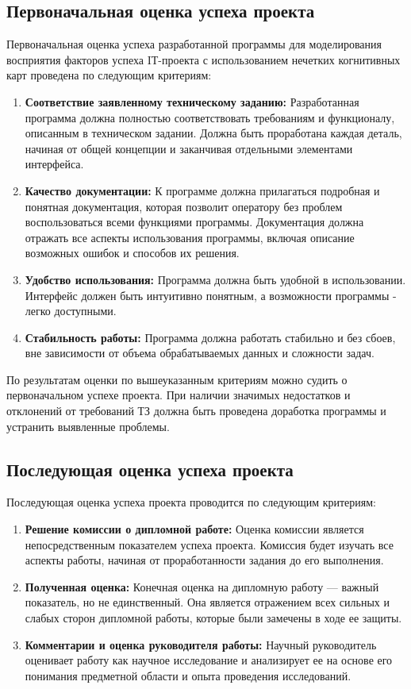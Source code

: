 \documentclass{article}
\begin{document}
    \subsection {Первоначальная оценка успеха проекта}
    Первоначальная оценка успеха разработанной программы для моделирования восприятия факторов успеха IТ-проекта с использованием нечетких когнитивных карт проведена по следующим критериям:
    \begin{enumerate}
        \item \textbf{Соответствие заявленному техническому заданию:} Разработанная программа должна полностью соответствовать требованиям и функционалу, описанным в техническом задании. Должна быть проработана каждая деталь, начиная от общей концепции и заканчивая отдельными элементами интерфейса.
        \item \textbf{Качество документации:} К программе должна прилагаться подробная и понятная документация, которая позволит оператору без проблем воспользоваться всеми функциями программы. Документация должна отражать все аспекты использования программы, включая описание возможных ошибок и способов их решения.
        \item \textbf{Удобство использования:} Программа должна быть удобной в использовании. Интерфейс должен быть интуитивно понятным, а возможности программы - легко доступными.
        \item \textbf{Стабильность работы:} Программа должна работать стабильно и без сбоев, вне зависимости от объема обрабатываемых данных и сложности задач.
    \end{enumerate}
    По результатам оценки по вышеуказанным критериям можно судить о первоначальном успехе проекта. При наличии значимых недостатков и отклонений от требований ТЗ должна быть проведена доработка программы и устранить выявленные проблемы.
    \subsection {Последующая оценка успеха проекта}
    Последующая оценка успеха проекта проводится по следующим критериям:
    \begin{enumerate}
        \item \textbf{Решение комиссии о дипломной работе:} Оценка комиссии является непосредственным показателем успеха проекта. Комиссия будет изучать все аспекты работы, начиная от проработанности задания до его выполнения.

        \item \textbf{Полученная оценка:} Конечная оценка на дипломную работу — важный показатель, но не единственный. Она является отражением всех сильных и слабых сторон дипломной работы, которые были замечены в ходе ее защиты.

        \item \textbf{Комментарии и оценка руководителя работы:} Научный руководитель оценивает работу как научное исследование и анализирует ее на основе его понимания предметной области и опыта проведения исследований.
    \end{enumerate}
\end{document}
